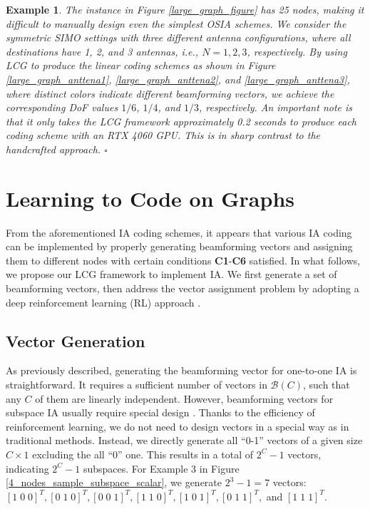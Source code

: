 \documentclass[a4paper,journal]{IEEEtran}
\newtheorem{exe}{Example}
\begin{document}
\begin{exe}\label{large_graph_exe}
The instance in Figure \ref{large_graph_figure} has 25 nodes, making it difficult to manually design even the simplest OSIA schemes. We consider the symmetric SIMO settings with three different antenna configurations, where all destinations have 1, 2, and 3 antennas, i.e., $N=1, 2, 3$, respectively. By using LCG to produce the linear coding schemes as shown in Figure \ref{large_graph_anttena1}, \ref{large_graph_anttena2}, and \ref{large_graph_anttena3}, where distinct colors indicate different beamforming vectors, we achieve the corresponding DoF values $1/6$, $1/4$, and $1/3$, respectively. An important note is that it only takes the LCG framework approximately 0.2 seconds to produce each coding scheme with an RTX 4060 GPU. This is in sharp contrast to the handcrafted approach. \hfill $\square$
\end{exe}


\section{Learning to Code on Graphs}
From the aforementioned IA coding schemes, it appears that various IA coding can be implemented by properly generating beamforming vectors and assigning them to different nodes with certain conditions \textbf{C1}-\textbf{C6} satisfied.
In what follows, we propose our LCG framework to implement IA. We first generate a set of beamforming vectors, then address the vector assignment problem by adopting a deep reinforcement learning (RL) approach \cite{lwd}.
\subsection{Vector Generation}
As previously described, generating the beamforming vector for one-to-one IA is straightforward. It requires a sufficient number of vectors in $\mathcal{B}(C)$, such that any $C$ of them are linearly independent. However, beamforming vectors for subspace IA usually require special design \cite{maleki2014index,suh2008interference}. Thanks to the efficiency of reinforcement learning, we do not need to design vectors in a special way as in traditional methods. Instead, we directly generate all ``0-1'' vectors of a given size $C \times 1$ excluding the all ``0'' one. This results in a total of $2^C - 1$ vectors, indicating $2^C - 1$ subspaces. 
For Example 3 in Figure \ref{4_nodes_sample_subspace_scalar}, we generate $2^3-1 = 7$ vectors: $[1 \; 0\; 0]^T, [0 \; 1\; 0]^T, [0 \; 0 \; 1]^T, [1 \; 1\; 0]^T, [1 \; 0\; 1]^T, [0 \; 1 \; 1]^T,$ and $[1 \; 1\; 1]^T$.
\end{document}
